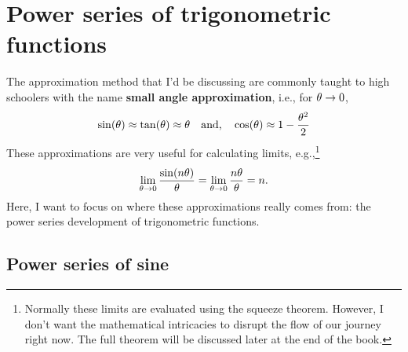 \section{Power series of trigonometric functions}

The approximation method that I'd be discussing are commonly taught to high schoolers with the name \textbf{small angle approximation}, i.e., for $\theta \rightarrow 0$, 
\begin{gather}
    \sin(\theta) \approx \tan(\theta) \approx \theta \quad\textrm{and,}\quad \cos(\theta) \approx 1 - \frac{\theta^2}{2}
\end{gather}
These approximations are very useful for calculating limits, e.g.,\footnote{Normally these limits are evaluated using the squeeze theorem. However, I don't want the mathematical intricacies to disrupt the flow of our journey right now. The full theorem will be discussed later at the end of the book.}
\begin{equation}
    \lim_{\theta \rightarrow 0}\frac{\sin(n\theta)}{\theta} = \lim_{\theta \rightarrow 0}\frac{n\theta}{\theta} = n.
\end{equation}
Here, I want to focus on where these approximations really comes from: the power series development of trigonometric functions.

\subsection{Power series of sine}

